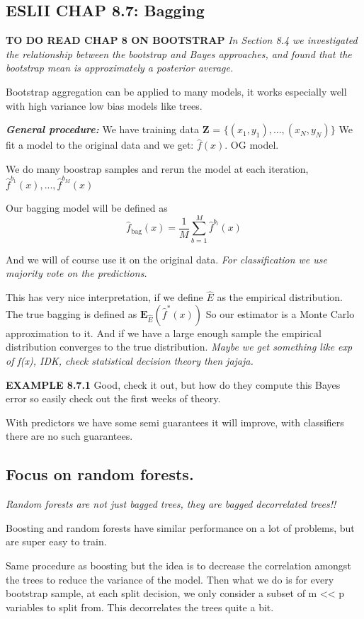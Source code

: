 \documentclass{article}
\begin{document}
\subsection{ESLII CHAP 8.7:  Bagging}
\textbf{TO DO READ CHAP 8 ON BOOTSTRAP} \textit{In Section 8.4 we investigated
the relationship between the bootstrap and Bayes approaches, and found
that the bootstrap mean is approximately a posterior average.}


Bootstrap aggregation can be applied to many models, it works especially well with high variance low bias models like trees.

\textbf{\textit{General procedure:}}
We have training data \textbf{Z} = $\{(x_1,y_1),...,(x_N, y_N) \}$
We fit a model to the original data and we get: $\hat{f}(x)$. OG model.

We do many boostrap samples and rerun the model at each iteration, $\hat{f}^{b_1}(x),...,\hat{f}^{b_M}(x)$

Our bagging model will be defined as $$\hat{f}_{\textrm{bag}}(x) = \frac{1}{M} \sum_{b=1}^M \hat{f}^{b_i}(x)$$

And we will of course use it on the original data. \textit{For classification we use majority vote on the predictions.}

This has very nice interpretation, if we define $\hat{E}$ as the empirical distribution.
The true bagging is defined as $\textbf{E}_{\hat{E}}(\hat{f}^*(x))$ So our estimator is a Monte Carlo approximation to it. And if we have a large enough sample the empirical distribution converges to the true distribution. \textit{Maybe we get something like exp of f(x), IDK, check statistical decision theory then jajaja. }

\textbf{EXAMPLE 8.7.1} Good, check it out, but how do they compute this Bayes error so easily check out the first weeks of theory.

With predictors we have some semi guarantees it will improve, with classifiers there are no such guarantees.

\subsection{Focus on random forests.}
\textit{Random forests are not just bagged trees, they are bagged decorrelated trees!!}

Boosting and random forests have similar performance on a lot of problems, but are super easy to train.

Same procedure as boosting but the idea is to decrease the correlation amongst the trees to reduce the variance of the model.
Then what we do is for every bootstrap sample, at each split decision, we only consider a subset of m << p variables to split from. This decorrelates the trees quite a bit.
\end{document}
